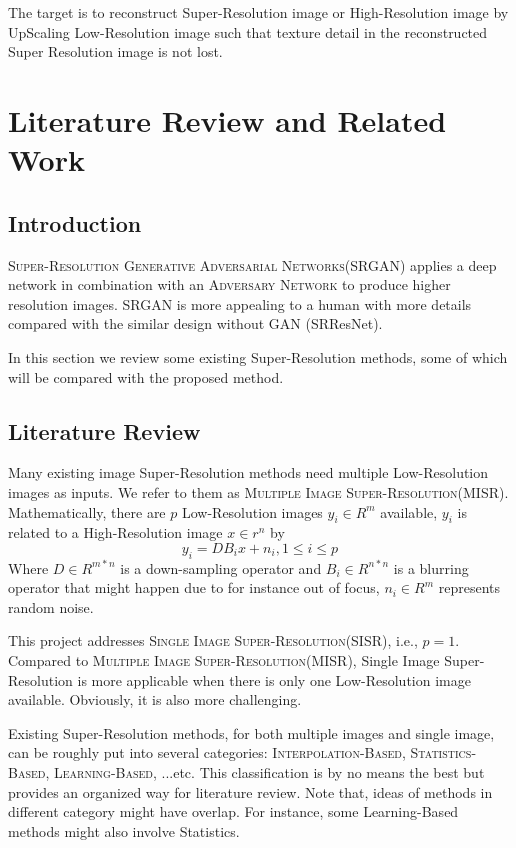\documentclass[12pt]{article}
\begin{document}
			The target is to reconstruct Super-Resolution image or High-Resolution image by UpScaling Low-Resolution image such that texture detail in the reconstructed Super Resolution image is not lost.
		
	\clearpage
	\section{Literature Review and Related Work}
		\subsection{Introduction}
			\textsc{Super-Resolution Generative Adversarial Networks}(SRGAN) applies a deep network in combination with an \textsc{Adversary Network} to produce higher resolution images. SRGAN is more appealing to a human with more details compared with the similar design without GAN (SRResNet).
			
			In this section we review some existing Super-Resolution methods, some of which will be compared with the proposed method.
		\subsection{Literature Review}
			Many existing image Super-Resolution methods need multiple Low-Resolution images as inputs. We refer to them as \textsc{Multiple Image Super-Resolution}(MISR). Mathematically, there are $p$ Low-Resolution images $y_i\in{R^m}$ available, $y_i$ is related to a High-Resolution image $x\in{r^n}$ by $$y_i = DB_ix+n_i, 1\leq{i}\leq{p}$$ Where $D\in{R^{m*n}}$ is a down-sampling operator and $B_i\in{R^{n*n}}$ is a blurring operator that might happen due to for instance out of focus, $n_i\in{R^m}$ represents random noise.\cite{1}
			
			This project addresses \textsc{Single Image Super-Resolution}(SISR), i.e., $p = 1$. Compared to \textsc{Multiple Image Super-Resolution}(MISR), Single Image Super-Resolution is more applicable when there is only one Low-Resolution image available. Obviously, it is also more challenging.
			
			Existing Super-Resolution methods, for both multiple images and single image, can be roughly put into several categories: \textsc{Interpolation-Based}, \textsc{Statistics-Based}, \textsc{Learning-Based}, ...etc. This classification is by no means the best but provides an organized way for literature review. Note that, ideas of methods in different category might have overlap. For instance, some Learning-Based methods might also involve Statistics.
			
\end{document}
